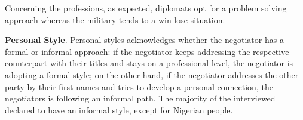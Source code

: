 \documentclass[../main.tex]{subfiles}
\begin{document}
\vspace{0.3cm}
\begin{minipage}{\linewidth}
    \label{negotiationAttitudePerProfession}
\end{minipage}
\vspace{0.3cm}

Concerning the professions, as expected, diplomats opt for a problem solving approach whereas the military tends to a win-lose situation.

\vspace{0.3cm}
\begin{minipage}{\linewidth}
    \label{negotiationAttitudePerProfession}
\end{minipage}
\vspace{0.3cm}

\textbf{Personal Style}. Personal styles acknowledges whether the negotiator has a formal or informal approach: if the negotiator keeps addressing the respective counterpart with their titles and stays on a professional level, the negotiator is adopting a formal style; on the other hand, if the negotiator addresses the other party by their first names and tries to develop a personal connection, the negotiators is following an informal path. The majority of the interviewed declared to have an informal style, except for Nigerian people. 

\vspace{0.3cm}
\begin{minipage}{\linewidth}
    \label{personalStylePerCountry}
\end{minipage}
\vspace{0.3cm}
\end{document}
